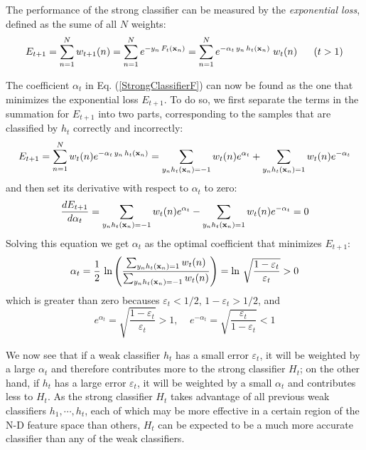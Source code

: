 \documentclass{article}
\begin{document}
The performance of the strong classifier can be measured by the 
{\em exponential loss}, defined as the sume of all $N$ weights:
\begin{equation}
  E_{t+1}=\sum_{n=1}^N w_{t+1}(n)=\sum_{n=1}^N e^{-y_n\,F_t({\bf x}_n)}
  =\sum_{n=1}^N e^{-\alpha_t\,y_n\, h_t({\bf x}_n)} \;w_t(n)
  \;\;\;\;\;\;(t>1)
\end{equation}

The coefficient $\alpha_t$ in Eq. (\ref{StrongClassifierF}) can now
be found as the one that minimizes the exponential loss $E_{t+1}$. 
To do so, we first separate the terms in the summation for $E_{t+1}$
into two parts, corresponding to the samples that are classified by
$h_t$ correctly and incorrectly:
\begin{equation}
  E_{t+1}=\sum_{n=1}^N w_t(n)e^{-\alpha_t \,y_n\,h_t({\bf x}_n)} 
  =\sum_{y_n h_t({\bf x}_n)=-1} w_t(n)e^{\alpha_t}
  +\sum_{y_n h_t({\bf x}_n)=1} w_t(n)e^{-\alpha_t}
\end{equation}
and then set its derivative with respect to $\alpha_t$ to zero:
\begin{equation}
  \frac{dE_{t+1}}{d\alpha_t}
  =\sum_{y_n h_t({\bf x}_n)=-1} w_t(n) e^{\alpha_t}
  -\sum_{y_n h_t({\bf x}_n)=1} w_t(n) e^{-\alpha_t}=0
\end{equation}
Solving this equation we get $\alpha_t$ as the optimal coefficient 
that minimizes $E_{t+1}$:
\begin{equation}
  \alpha_t=\frac{1}{2}\,\ln \left(
  \frac{\sum_{y_n h_t({\bf x}_n)=1} w_t(n)}{\sum_{y_n h_t({\bf x}_n)=-1} w_t(n)}\right)
  =\ln\,\sqrt{\frac{1-\varepsilon_t}{\varepsilon_t}} > 0
\end{equation}
which is greater than zero becauses $\varepsilon_t<1/2$,
$1-\varepsilon_t>1/2$, and 
\begin{equation}
  e^{\alpha_t}=\sqrt{\frac{1-\varepsilon_t}{\varepsilon_t}}>1,\;\;\;\;
  e^{-\alpha_t}=\sqrt{\frac{\varepsilon_t}{1-\varepsilon_t}}<1
\end{equation}

We now see that if a weak classifier $h_t$ has a small error 
$\varepsilon_t$, it will be weighted by a large $\alpha_t$ and therefore
contributes more to the strong classifier $H_t$; on the other hand, if 
$h_t$ has a large error $\varepsilon_t$, it will be weighted by a small
$\alpha_t$ and contributes less to $H_t$. As the strong classifier $H_t$ 
takes advantage of all previous weak classifiers $h_1,\cdots,h_t$, each 
of which may be more effective in a certain region of the N-D feature 
space than others, $H_t$ can be expected to be a much more accurate 
classifier than any of the weak classifiers.
\end{document}
